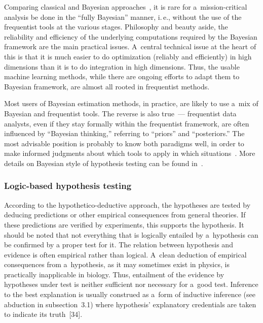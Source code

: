 \begin{multicols}{2}
  Comparing classical and Bayesian approaches~\cite{27-kl}, it is rare for a~mission-critical analysis be done in the ``fully Bayesian'' manner, i.\,e., without the
use of the frequentist tools at the various stages. Philosophy and
beauty aside, the reliability and efficiency of the underlying computations
required by the Bayesian
framework are the main practical issues. A~central technical issue at the
heart of this is that it is much easier to do optimization (reliably
and efficiently) in high dimensions than it is to do integration in high
dimensions.
Thus, the usable machine learning methods, while there are ongoing
efforts to adapt them to Bayesian framework, are almost all rooted in
frequentist methods.

  Most users of Bayesian estimation methods, in practice, are likely to use a~mix of Bayesian and frequentist tools. The reverse is also true~--- frequentist data analysts, even if they stay formally within the frequentist framework, are often influenced by
``Bayesian thinking,'' referring to ``priors'' and ``posteriors.'' The most advisable
position is probably to know both paradigms well, in order to make informed
judgments about which tools to apply in which situations~\cite{27-kl}.  More details on Bayesian style of hypothesis testing can be found
in~\cite{27-kl,  28-kl, 33-kl}.

\vspace*{-8pt}

\subsubsection{Logic-based hypothesis testing}


\noindent
  According to the hypothetico-deductive approach, the hypotheses are tested by
deducing predictions or other empirical consequences from general theories. If these
predictions are verified by experiments, this supports the hypothesis. It should be noted that not
everything that is logically entailed by a~hypothesis can be confirmed by
a proper test for it. The relation between hypothesis and evidence is often
empirical rather than logical. A~clean deduction of empirical consequences from
a~hypothesis,
as it may sometimes exist in physics, is practically inapplicable in biology.
Thus, entailment of the evidence by hypotheses under test is neither sufficient
nor necessary
for a~good test. Inference to the best explanation is usually construed
as a~form of inductive inference (see abduction in subsection~3.1) where hypothesis' explanatory
credentials are taken to indicate its truth~[34].


\end{multicols}
